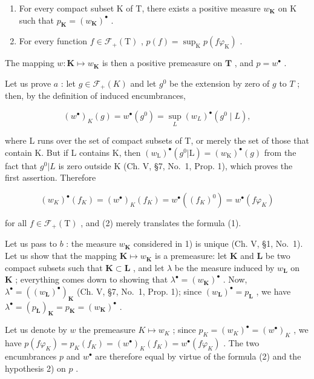 \begin{enumerate}
\def\labelenumi{\arabic{enumi})}
\item
  For every compact subset K of T, there exists a positive measure \(w_{\mathbf{K}}\) on K such that \(p_{\mathbf{K}} = (w_{\mathbf{K}})^{\bullet}\) .
\item
  For every function \(f \in \mathcal{F}_{+}(\mathrm{T})\) , \(p(f) = \sup_{\mathrm{K}} p(f\varphi_{\mathrm{K}})\) .
\end{enumerate}

The mapping \(w: \mathbf{K} \mapsto w_{\mathbf{K}}\) is then a positive premeasure on \(\mathbf{T}\) , and \(p = w^{\bullet}\) .

Let us prove \(a\) : let \(g \in \mathcal{F}_{+}(K)\) and let \(g^{0}\) be the extension by zero of \(g\) to \(T\) ; then, by the definition of induced encumbrances,

\[
(w ^ {\bullet}) _ {K} (g) = w ^ {\bullet} \left(g ^ {0}\right) = \sup _ {L} \left(w _ {L}\right) ^ {\bullet} \left(g ^ {0} \mid L\right),
\]

where L runs over the set of compact subsets of T, or merely the set of those that contain K. But if L contains K, then \((w_{\mathrm{L}})^{\bullet}(g^{0}|\mathrm{L})=(w_{\mathrm{K}})^{\bullet}(g)\) from the fact that \(g^{0}|L\) is zero outside K (Ch. V, §7, No.~1, Prop. 1), which proves the first assertion. Therefore

\[
(w _ {K}) ^ {\bullet} (f _ {K}) = (w ^ {\bullet}) _ {K} (f _ {K}) = w ^ {\bullet} \left((f _ {K}) ^ {0}\right) = w ^ {\bullet} (f \varphi_ {K})
\]

for all \(f \in \mathcal{F}_{+}(\mathrm{T})\) , and (2) merely translates the formula (1).

Let us pass to \(b\) : the measure \(w_{\mathbf{K}}\) considered in 1) is unique (Ch. V, §1, No.~1). Let us show that the mapping \(\mathbf{K} \mapsto w_{\mathbf{K}}\) is a premeasure: let \(\mathbf{K}\) and \(\mathbf{L}\) be two compact subsets such that \(\mathbf{K} \subset \mathbf{L}\) , and let \(\lambda\) be the measure induced by \(w_{\mathbf{L}}\) on \(\mathbf{K}\) ; everything comes down to showing that \(\lambda^{\bullet} = (w_{\mathbf{K}})^{\bullet}\) . Now, \(\lambda^{\bullet} = ((w_{\mathbf{L}})^{\bullet})_{\mathbf{K}}\) (Ch. V, §7, No.~1, Prop. 1); since \((w_{\mathbf{L}})^{\bullet} = p_{\mathbf{L}}\) , we have \(\lambda^{\bullet} = (p_{\mathbf{L}})_{\mathbf{K}} = p_{\mathbf{K}} = (w_{\mathbf{K}})^{\bullet}\) .

Let us denote by \(w\) the premeasure \(K \mapsto w_K\) ; since \(p_K = (w_K)^{\bullet} = (w^{\bullet})_K\) , we have \(p(f\varphi_K) = p_K(f_K) = (w^{\bullet})_K(f_K) = w^{\bullet}(f\varphi_K)\) . The two encumbrances \(p\) and \(w^{\bullet}\) are therefore equal by virtue of the formula (2) and the hypothesis 2) on \(p\) .


